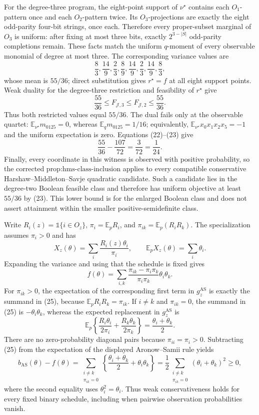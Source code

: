 For the degree-three program, the eight-point support of \(\nu^\star\) contains each \(O_1\)-pattern once and each \(O_2\)-pattern twice.  Its \(O_3\)-projections are exactly the eight odd-parity four-bit strings, once each.  Therefore every proper-subset marginal of \(O_3\) is uniform: after fixing at most three bits, exactly \(2^{3-|S|}\) odd-parity completions remain.  These facts match the uniform \(q\)-moment of every observable monomial of degree at most three.  The corresponding variance values are
\[
\frac83,\frac{14}{9},\frac23,\frac89,
\frac{14}{9},\frac23,\frac{14}{9},\frac83,
\]
whose mean is \(55/36\); direct substitution gives \(r^\star=f\) at all eight support points.  Weak duality for the degree-three restriction and feasibility of \(r^\star\) give
\[
 \frac{55}{36}\le F_{\mathcal J,3}\le F_{\mathcal J,2}\le\frac{55}{36}. \tag{23}
\]
Thus both restricted values equal \(55/36\).  The dual fails only at the observable quartet: \(\mathbb E_{\nu^\star}m_{0125}=0\), whereas \(\mathbb E_qm_{0125}=1/16\); equivalently, \(\mathbb E_{\nu^\star}x_0x_1x_2x_5=-1\) and the uniform expectation is zero.  Equations (22)--(23) give
\[
 \frac{55}{36}-\frac{107}{72}=\frac{3}{72}=\frac1{24}. \tag{24}
\]
Finally, every coordinate in this witness is observed with positive probability, so the corrected \(\text{prop:hms-class-inclusion}\) applies to every compatible conservative Harshaw--Middleton--Savje quadratic candidate.  Such a candidate lies in the degree-two Boolean feasible class and therefore has uniform objective at least \(55/36\) by (23).  This lower bound is for the enlarged Boolean class and does not assert attainment within the smaller positive-semidefinite class.

Write \(R_i(z)=\mathbb 1\{i\in O_z\}\), \(\pi_i=\mathbb E_pR_i\), and \(\pi_{ik}=\mathbb E_p(R_iR_k)\).  The specialization assumes \(\pi_i>0\) and has
\[
 X_z(\theta)=\sum_i\frac{R_i(z)\theta_i}{\pi_i},
 \quad\quad \mathbb E_pX_z(\theta)=\sum_i\theta_i.
\]
Expanding the variance and using that the schedule is fixed gives
\[
 f(\theta)=\sum_{i,k}
 \frac{\pi_{ik}-\pi_i\pi_k}{\pi_i\pi_k}\theta_i\theta_k. \tag{25}
\]
For \(\pi_{ik}>0\), the expectation of the corresponding first term in \(g_z^{\mathrm{AS}}\) is exactly the summand in (25), because \(\mathbb E_pR_iR_k=\pi_{ik}\).  If \(i\ne k\) and \(\pi_{ik}=0\), the summand in (25) is \(-\theta_i\theta_k\), whereas the expected replacement in \(g_z^{\mathrm{AS}}\) is
\[
 \mathbb E_p\left\{
 \frac{R_i\theta_i}{2\pi_i}+\frac{R_k\theta_k}{2\pi_k}
 \right\}=\frac{\theta_i+\theta_k}{2}. \tag{26}
\]
There are no zero-probability diagonal pairs because \(\pi_{ii}=\pi_i>0\).  Subtracting (25) from the expectation of the displayed Aronow--Samii rule yields
\[
 b_{\mathrm{AS}}(\theta)-f(\theta)
 =\sum_{\substack{i\ne k\\\pi_{ik}=0}}
 \left\{\frac{\theta_i+\theta_k}{2}+\theta_i\theta_k\right\}
 =\frac12\sum_{\substack{i\ne k\\\pi_{ik}=0}}
       (\theta_i+\theta_k)^2\ge0, \tag{27}
\]
where the second equality uses \(\theta_i^2=\theta_i\).  Thus weak conservativeness holds for every fixed binary schedule, including when pairwise observation probabilities vanish.

